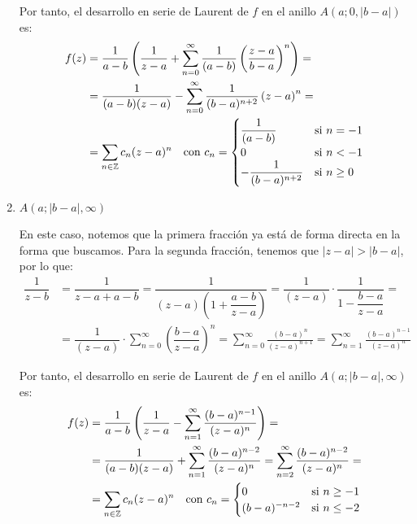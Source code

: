 \begin{ejercicio}
\begin{enumerate}
        Por tanto, el desarrollo en serie de Laurent de $f$ en el anillo $A(a; 0, |b - a|)$ es:
        \begin{align*}
            f(z) &= \dfrac{1}{a - b} \left( \dfrac{1}{z - a} + \sum_{n=0}^{\infty} \frac{1}{(a-b)} \left(\frac{z-a}{b-a}\right)^n \right)
            =\\&=
            \dfrac{1}{(a-b)(z - a)} - \sum_{n=0}^{\infty} \frac{1}{(b-a)^{n+2}} \left(z-a\right)^n
            =\\&= \sum_{n\in \mathbb{Z}} c_n (z-a)^n
            \quad \text{con } c_n = \begin{cases}
                \dfrac{1}{(a-b)} & \text{si } n=-1\\
                0 & \text{si } n < -1\\
                -\dfrac{1}{(b-a)^{n+2}} & \text{si } n \geq 0
            \end{cases}
        \end{align*}
        \item $A(a; |b - a|, \infty)$
        
        En este caso, notemos que la primera fracción ya está de forma directa en la forma que buscamos. Para la segunda fracción, tenemos que $|z - a| > |b - a|$, por lo que:
        \begin{align*}
            \dfrac{1}{z-b} &= \dfrac{1}{z-a+a-b}
            = \dfrac{1}{(z-a)\left(1+\dfrac{a-b}{z-a}\right)}
            = \dfrac{1}{(z-a)} \cdot \dfrac{1}{1-\dfrac{b-a}{z-a}}
            =\\&= \dfrac{1}{(z-a)} \cdot \sum_{n=0}^{\infty} \left(\dfrac{b-a}{z-a}\right)^n
            = \sum_{n=0}^{\infty} \frac{(b-a)^n}{(z-a)^{n+1}}
            = \sum_{n=1}^{\infty} \frac{(b-a)^{n-1}}{(z-a)^n}
        \end{align*}

        Por tanto, el desarrollo en serie de Laurent de $f$ en el anillo $A(a; |b - a|, \infty)$ es:
        \begin{align*}
            f(z) &= \dfrac{1}{a - b} \left( \dfrac{1}{z - a} - \sum_{n=1}^{\infty} \frac{(b-a)^{n-1}}{(z-a)^n} \right)
            =\\&= \dfrac{1}{(a-b)(z - a)} + \sum_{n=1}^{\infty} \frac{(b-a)^{n-2}}{(z-a)^{n}} = \sum_{n=2}^{\infty} \frac{(b-a)^{n-2}}{(z-a)^{n}}
            =\\&= \sum_{n\in \mathbb{Z}} c_n (z-a)^n
            \quad \text{con } c_n = \begin{cases}
                0 & \text{si } n \geq -1\\
                (b-a)^{-n-2} & \text{si } n \leq -2
            \end{cases}
        \end{align*}
    \end{enumerate}
\end{ejercicio}

